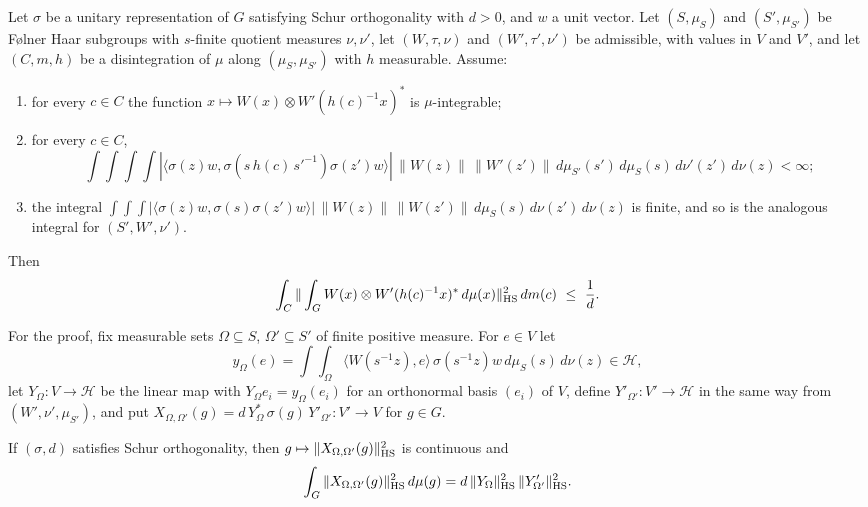 \begin{theorem}\label{pf:sh-local:energyabs}
Let $\sigma$ be a unitary representation of $G$ satisfying Schur orthogonality with $d>0$, and $w$ a unit vector.
Let $(S,\mu_S)$ and $(S',\mu_{S'})$ be F\o lner Haar subgroups with $s$-finite quotient measures $\nu,\nu'$, let
$(W,\tau,\nu)$ and $(W',\tau',\nu')$ be admissible, with values in $V$ and $V'$, and let $(C,m,h)$ be a
disintegration of $\mu$ along $(\mu_S,\mu_{S'})$ with $h$ measurable. Assume:
\begin{enumerate}[label=(\roman*)]
\item for every $c\in C$ the function $x\mapsto W(x)\otimes W'(h(c)^{-1}x)^*$ is $\mu$-integrable;
\item for every $c\in C$,
\[
\int\!\!\int\!\!\int\!\!\int|\langle\sigma(z)w,\sigma(s\,h(c)\,s'^{-1})\sigma(z')w\rangle|\,\|W(z)\|\,\|W'(z')\|
\,d\mu_{S'}(s')\,d\mu_S(s)\,d\nu'(z')\,d\nu(z)<\infty;
\]
\item the integral $\int\!\int\!\int|\langle\sigma(z)w,\sigma(s)\sigma(z')w\rangle|\,\|W(z)\|\,\|W(z')\|\,d\mu_S(s)\,
d\nu(z')\,d\nu(z)$ is finite, and so is the analogous integral for $(S',W',\nu')$.
\end{enumerate}
Then
\[
\int_C\|\int_G W(x)\otimes W'(h(c)^{-1}x)^*\,d\mu(x)\|_{\mathrm{HS}}^2\,dm(c)\ \le\ \frac1d .
\]
\end{theorem}

For the proof, fix measurable sets $\Omega\subseteq S$, $\Omega'\subseteq S'$ of finite positive measure. For $e\in V$ let
\[
y_\Omega(e)=\int\!\int_{\Omega}\langle W(s^{-1}z),e\rangle\,\sigma(s^{-1}z)w\,d\mu_S(s)\,d\nu(z)\in\mathcal H,
\]
let $Y_\Omega:V\to\mathcal H$ be the linear map with $Y_\Omega e_i=y_\Omega(e_i)$ for an orthonormal basis $(e_i)$ of
$V$, define $Y'_{\Omega'}:V'\to\mathcal H$ in the same way from $(W',\nu',\mu_{S'})$, and put
$X_{\Omega,\Omega'}(g)=d\,Y_\Omega^*\,\sigma(g)\,Y'_{\Omega'}:V'\to V$ for $g\in G$.

\begin{lemma}\label{pf:sh-local:energyX}
If $(\sigma,d)$ satisfies Schur orthogonality, then $g\mapsto\|X_{\Omega,\Omega'}(g)\|_{\mathrm{HS}}^2$ is continuous and
\[
\int_G\|X_{\Omega,\Omega'}(g)\|_{\mathrm{HS}}^2\,d\mu(g)=d\,\|Y_\Omega\|_{\mathrm{HS}}^2\,\|Y'_{\Omega'}\|_{\mathrm{HS}}^2 .
\]
\end{lemma}

